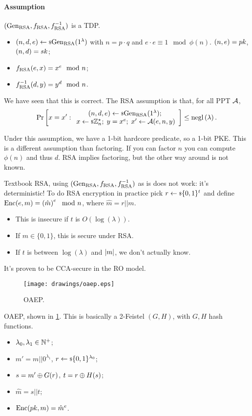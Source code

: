 \paragraph{Assumption} $(\mathrm{Gen}_{\mathrm{RSA}}, f_{\mathrm{RSA}}, f_{\mathrm{RSA}}^{-1})$ is a \ac{TDP}.
\begin{itemize}
	\item $(n,d,e) \leftarrow {\scriptstyle \$} {\mathrm{Gen}_{\mathrm{RSA}}(1^{\lambda})}$ with $n = p \cdot q$ and $e \cdot e \equiv 1 \mod \phi(n)$.
		$(n,e) = pk$, $(n,d) = sk$;
	\item $f_{\mathrm{RSA}}(e,x) = x^e \mod n$;
	\item $f_{\mathrm{RSA}}^{-1}(d,y) = y^d \mod n$.
\end{itemize}
We have seen that this is correct.
The \ac{RSA} assumption is that, for all \ac{PPT} $\mathcal{A}$,
\begin{equation*}
	\mathop{\mathrm{Pr}}\limits_{} \left[ {
		x = x' :
		\begin{array}{c}
		(n,d,e) \leftarrow {\scriptstyle \$} {\mathrm{Gen}_{\mathrm{RSA}}(1^{\lambda})}; \;
		\\
		x \leftarrow {\scriptstyle \$} {\mathbb{Z}_n^{\star}}; \;
		y = x^e; \;
		x' \leftarrow \mathcal{A}(e, n, y)
		\end{array}
	} \right]
	\le \mathrm{negl}\left({\lambda}\right).
\end{equation*}

Under this assumption, we have a 1-bit hardcore predicate, so a 1-bit \ac{PKE}.
This is a different assumption than factoring.
If you can factor $n$ you can compute $\phi(n)$ and thus $d$.
\ac{RSA} implies factoring, but the other way around is not known.

Textbook \ac{RSA}, \ie using $(\mathrm{Gen}_{\mathrm{RSA}}, f_{\mathrm{RSA}}, f_{\mathrm{RSA}}^{-1})$ as is does not work: it's deterministic!
To do \ac{RSA} encryption in practice pick $r \leftarrow {\scriptstyle \$} {\{0,1\}^{t}}$ and define $\mathrm{Enc}(e,m) = \left(\hat{m}\right)^{e} \mod n$, where $\hat{m} = r || m$.
\begin{itemize}
	\item This is insecure if $t$ is $O(\log(\lambda))$.
	\item If $m \in \{0,1\}$, this is secure under \ac{RSA}.
	\item If $t$ is between $\log(\lambda)$ and $\left|{m}\right|$, we don't actually know.
\end{itemize}
It's proven to be \ac{CCA}-secure in the \ac{RO} model. 

\begin{construction} \label{cons:oaep}
	\begin{figure}
		\centering
		\texttt{[image: drawings/oaep.eps]}
		\caption{\acl{OAEP}.}
		\label{fig:oaep}
	\end{figure}
	\ac{OAEP}, shown in \cref{fig:oaep}.
	This is basically a 2-Feistel $(G,H)$, with $G,H$ hash functions.
	\begin{itemize}
		\item $\lambda_0, \lambda_1 \in \mathbb{N}^{+}$;
		\item $m' = m || 0^{\lambda_1}$, $r \leftarrow {\scriptstyle \$} {\{0,1\}^{\lambda_0}}$;
		\item $s = m' \oplus G(r)$, $t = r \oplus H(s)$;
		\item $\hat{m} = s || t$;
		\item $\mathrm{Enc}(pk, m) = \hat{m}^{e}$. \qedhere
	\end{itemize}
\end{construction}

